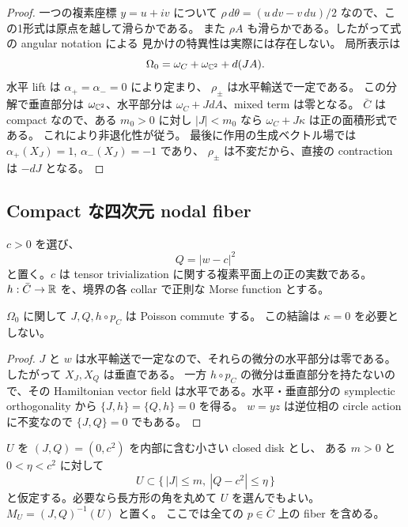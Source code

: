 \begin{proof}
一つの複素座標 $y=u+iv$ について
$\rho\,d\theta=(u\,dv-v\,du)/2$ なので、この1形式は原点を越して滑らかである。
また $\rho A$ も滑らかである。したがって式の angular notation による
見かけの特異性は実際には存在しない。
局所表示は
\[
 \Omega_0=\omega_C+\omega_{\mathbb C^2}+d(JA).
\]
水平 lift は $\alpha_+=\alpha_-=0$ により定まり、
$\rho_\pm$ は水平輸送で一定である。
この分解で垂直部分は $\omega_{\mathbb C^2}$、水平部分は
$\omega_C+JdA$、mixed term は零となる。
$\bar C$ は compact なので、ある $m_0>0$ に対し
$|J|<m_0$ なら $\omega_C+J\kappa$ は正の面積形式である。
これにより非退化性が従う。
最後に作用の生成ベクトル場では
$\alpha_+(X_J)=1$, $\alpha_-(X_J)=-1$ であり、
$\rho_\pm$ は不変だから、直接の contraction は $-dJ$ となる。
\end{proof}

\subsection{Compact な四次元 nodal fiber}

$c>0$ を選び、
\begin{equation}\label{lc:construction-q}
 Q=|w-c|^2
\end{equation}
と置く。$c$ は tensor trivialization に関する複素平面上の正の実数である。
$h:\bar C\to\mathbb R$ を、境界の各 collar で正則な Morse function とする。

\begin{proposition}\label{lc:construction-commuting}
$\Omega_0$ に関して $J,Q,h\circ p_C$ は Poisson commute する。
この結論は $\kappa=0$ を必要としない。
\end{proposition}

\begin{proof}
$J$ と $w$ は水平輸送で一定なので、それらの微分の水平部分は零である。
したがって $X_J,X_Q$ は垂直である。
一方 $h\circ p_C$ の微分は垂直部分を持たないので、その Hamiltonian vector field
は水平である。水平・垂直部分の symplectic orthogonality から
$\{J,h\}=\{Q,h\}=0$ を得る。
$w=yz$ は逆位相の circle action に不変なので $\{J,Q\}=0$ でもある。
\end{proof}

$U$ を $(J,Q)=(0,c^2)$ を内部に含む小さい closed disk とし、
ある $m>0$ と $0<\eta<c^2$ に対して
\begin{equation}\label{lc:construction-window}
 U\subset\{\,|J|\le m,\ |Q-c^2|\le\eta\,\}
\end{equation}
と仮定する。必要なら長方形の角を丸めて $U$ を選んでもよい。
$M_U=(J,Q)^{-1}(U)$ と置く。
ここでは全ての $p\in\bar C$ 上の fiber を含める。

